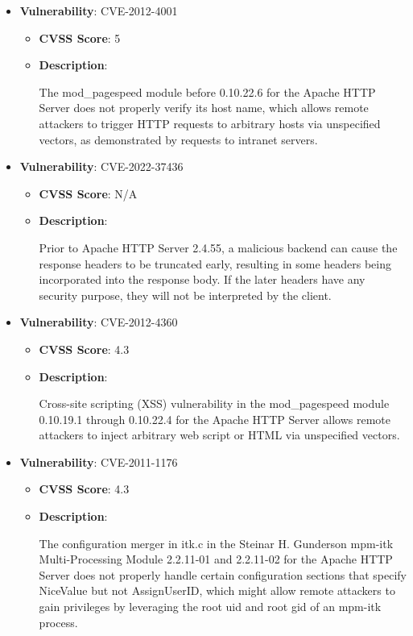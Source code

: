 \documentclass{article}
\begin{document}
\begin{itemize}
        \item \textbf{Vulnerability}: CVE-2012-4001
        \begin{itemize}
            \item \textbf{CVSS Score}:  5 
            \item \textbf{Description}:
            \parbox[t]{0.9\linewidth}{
                \ttfamily The mod\_pagespeed module before 0.10.22.6 for the Apache HTTP Server does not properly verify its host name, which allows remote attackers to trigger HTTP requests to arbitrary hosts via unspecified vectors, as demonstrated by requests to intranet servers.
            }
        \end{itemize}
    
        \item \textbf{Vulnerability}: CVE-2022-37436
        \begin{itemize}
            \item \textbf{CVSS Score}:  N/A 
            \item \textbf{Description}:
            \parbox[t]{0.9\linewidth}{
                \ttfamily Prior to Apache HTTP Server 2.4.55, a malicious backend can cause the response headers to be truncated early, resulting in some headers being incorporated into the response body. If the later headers have any security purpose, they will not be interpreted by the client.
            }
        \end{itemize}
    
        \item \textbf{Vulnerability}: CVE-2012-4360
        \begin{itemize}
            \item \textbf{CVSS Score}:  4.3 
            \item \textbf{Description}:
            \parbox[t]{0.9\linewidth}{
                \ttfamily Cross-site scripting (XSS) vulnerability in the mod\_pagespeed module 0.10.19.1 through 0.10.22.4 for the Apache HTTP Server allows remote attackers to inject arbitrary web script or HTML via unspecified vectors.
            }
        \end{itemize}
    
        \item \textbf{Vulnerability}: CVE-2011-1176
        \begin{itemize}
            \item \textbf{CVSS Score}:  4.3 
            \item \textbf{Description}:
            \parbox[t]{0.9\linewidth}{
                \ttfamily The configuration merger in itk.c in the Steinar H. Gunderson mpm-itk Multi-Processing Module 2.2.11-01 and 2.2.11-02 for the Apache HTTP Server does not properly handle certain configuration sections that specify NiceValue but not AssignUserID, which might allow remote attackers to gain privileges by leveraging the root uid and root gid of an mpm-itk process.
            }
        \end{itemize}
    

\end{itemize}
\end{document}

